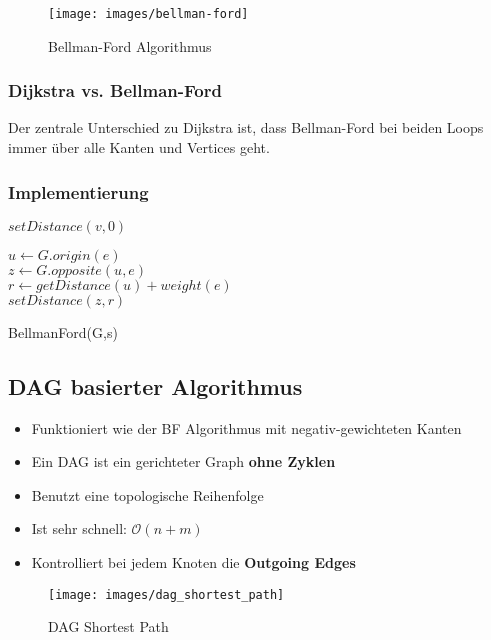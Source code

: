 \begin{figure}[h]
\centering
\texttt{[image: images/bellman-ford]}
\caption{Bellman-Ford Algorithmus}
\label{fig:bellman-ford}
\end{figure}

\subsubsection{Dijkstra vs. Bellman-Ford}
Der zentrale Unterschied zu Dijkstra ist, dass Bellman-Ford bei beiden Loops immer über alle Kanten und Vertices geht.

\subsubsection{Implementierung}
\begin{algorithm}[H]
	{
		{
			
			$setDistance(v,0)$ 
		}
		 {
			$u \leftarrow G.origin(e)$ \\	
			$z \leftarrow G.opposite(u, e)$ \\
			$r \leftarrow getDistance(u) + weight(e)$ \\
			{
				$setDistance(z,r)$
			}
		} 
	}
\caption{BellmanFord(G,s)}
\end{algorithm}

\subsection{DAG basierter Algorithmus}
\begin{itemize}
	\item Funktioniert wie der BF Algorithmus mit negativ-gewichteten Kanten
	\item Ein DAG ist ein gerichteter Graph \textbf{ohne Zyklen}
	\item Benutzt eine topologische Reihenfolge
	\item Ist sehr schnell: $\mathcal{O}(n+m)$
	\item Kontrolliert bei jedem Knoten die \textbf{Outgoing Edges}
\end{itemize}

\begin{figure}[h]
\centering
\texttt{[image: images/dag\_shortest\_path]}
\caption{DAG Shortest Path}
\label{fig:dagshortestpath}
\end{figure}


